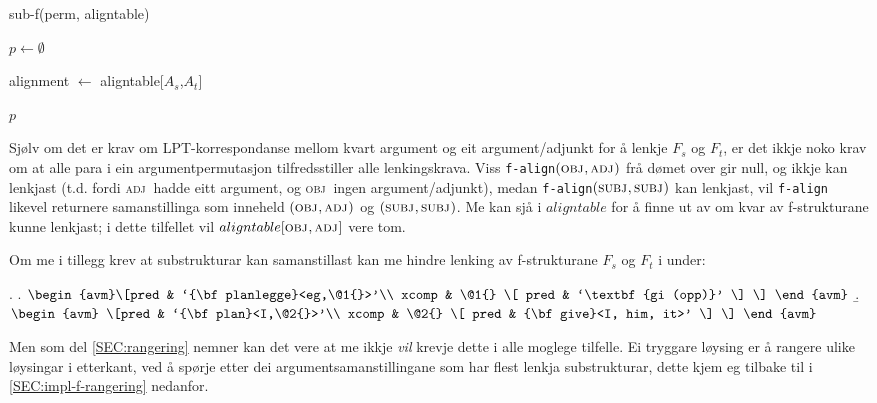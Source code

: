 \documentclass[12pt,a4paper,oneside,draft]{report}
\newcommand{\F}[2]{\textsc{#1}\ensuremath{_{#2}}}
\newcommand{\OBJ}{\F{obj}{}}
\newcommand{\OBJs}{\F{obj~}{}}
\newcommand{\ADJ}{\F{adj}{}}
\newcommand{\ADJs}{\F{adj~}{}}
\newcommand{\SUBJ}{\F{subj}{}}
\newcommand{\p}[1]{`\textbf{#1}'}
\begin{document}
  \begin{algorithm}[htbp]
    \caption{sub-f(perm, aligntable)}
    \label{algo:sub-f}
    
    $p \gets \emptyset$  \;
         {
           {
            alignment $\gets$ aligntable[$A_s$,$A_t$] \;
          }
          
        }
    \Return $p$
  \end{algorithm}    

Sjølv om det er krav om LPT\hyp{}korrespondanse mellom kvart argument og
eit argument/adjunkt for å lenkje $F_s$ og $F_t$, er det ikkje noko
krav om at alle para i ein argumentpermutasjon tilfredsstiller alle
lenkingskrava. Viss \texttt{f-align}$(\OBJ,\ADJ)$ frå dømet over gir
null, og ikkje kan lenkjast (t.d. fordi \ADJs hadde eitt argument, og
\OBJs ingen argument/adjunkt), medan \texttt{f-align}$(\SUBJ,\SUBJ)$
kan lenkjast, vil \texttt{f-align} likevel returnere samanstillinga som
inneheld $(\OBJ,\ADJ)$ og $(\SUBJ,\SUBJ)$. Me kan sjå i $aligntable$
for å finne ut av om kvar av f\hyp{}strukturane kunne lenkjast; i dette
tilfellet vil $aligntable[\OBJ,\ADJ]$ vere tom.



Om me i tillegg krev at substrukturar kan samanstillast kan me
 hindre lenking av f\hyp{}strukturane $F_s$ og $F_t$ i \Next under:

{\avmoptions{}
\ex. \a.  $\begin{avm}\[pred & `{\bf planlegge}<eg,\@1{}>'\\
   xcomp & \@1{} \[  pred & \p{gi (opp)} \] \] \end{avm}$
  \b. $\begin{avm} \[pred & `{\bf plan}<I,\@2{}>'\\
   xcomp & \@2{} \[  pred & {\bf give}<I, him, it>' \] \] \end{avm}$

}

Men som del \ref{SEC:rangering} nemner kan det vere at me ikkje \emph{vil}
krevje dette i alle moglege tilfelle. Ei tryggare løysing er å rangere
ulike løysingar i etterkant, ved å spørje etter dei
argumentsamanstillingane som har flest lenkja substrukturar, dette
kjem eg tilbake til i \ref{SEC:impl-f-rangering} nedanfor.
\end{document}
